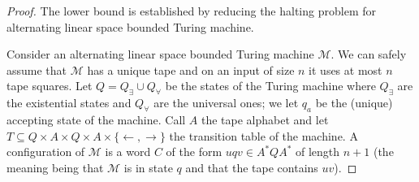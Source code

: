 \begin{proof}
The lower bound is established by reducing the halting problem for alternating linear space bounded Turing machine. 

Consider an alternating linear space bounded Turing machine $\mathcal{M}$. We can safely assume that $\mathcal{M}$ has a unique tape and on an input of size $n$ it uses at most $n$ tape squares. Let $Q=Q_\exists\cup Q_\forall$ be the states of the Turing machine where $Q_\exists$ are the existential states and $Q_\forall$ are the universal ones; we let $q_a$ be the (unique) accepting state of the machine. Call $A$ the tape alphabet and let $T\subseteq Q\times A\times Q\times A\times \{\leftarrow,\rightarrow\}$ the transition table of the machine. A configuration of $\mathcal{M}$ is a word $C$ of the form $uqv\in A^*QA^*$ of length $n+1$ (the meaning being that $\mathcal{M}$ is in state $q$ and that the tape contains $uv$).




\end{proof}
